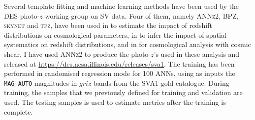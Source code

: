 Several template fitting and machine learning methods have been used by the DES photo-$z$ working group on SV data. Four of them, namely \textsc{ANNz2}, \textsc{BPZ}, \textsc{skynet} and \textsc{tpz}, have been used in \citet{bonnett} to estimate the impact of redshift distributions on cosmological parameters, in \citet{leistedt16} to infer the impact of spatial systematics on redshift distributions, and in \citet{SVkey} for cosmological analysis with cosmic shear.
I have used \textsc{ANNz2} to produce the photo-$z$'s used in these analysis and released at \url{https://des.ncsa.illinois.edu/releases/sva1}. The training has been performed in randomised regression mode for 100 ANNs, using as inputs the \texttt{MAG\_AUTO} magnitudes in $griz$ bands from the SVA1 gold catalogue. During training, the samples that we previously defined for training and validation are used. The testing samples is used to estimate metrics after the training is complete.

